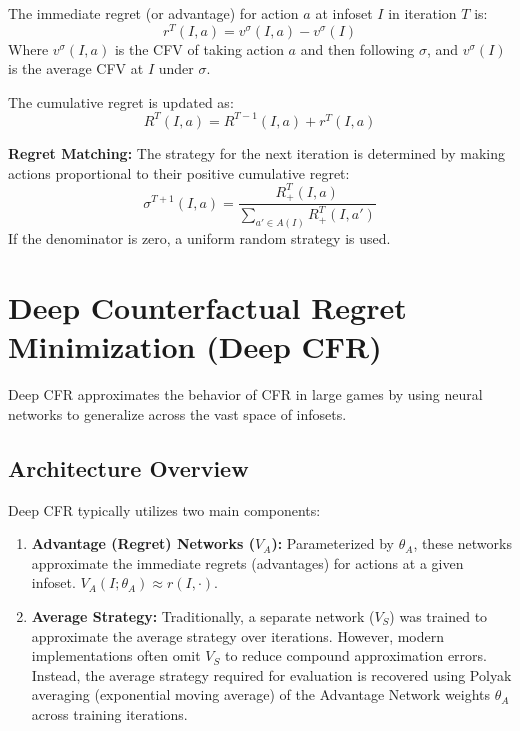 \documentclass[11pt,a4paper]{article}
\begin{document}
The immediate regret (or advantage) for action $a$ at infoset $I$ in iteration $T$ is:
\begin{equation}
r^T(I, a) = v^\sigma(I, a) - v^\sigma(I)
\end{equation}
Where $v^\sigma(I, a)$ is the CFV of taking action $a$ and then following $\sigma$, and $v^\sigma(I)$ is the average CFV at $I$ under $\sigma$.

The cumulative regret is updated as:
\begin{equation}
R^T(I, a) = R^{T-1}(I, a) + r^T(I, a)
\end{equation}

\textbf{Regret Matching:} The strategy for the next iteration is determined by making actions proportional to their positive cumulative regret:
\begin{equation}
\sigma^{T+1}(I, a) = \frac{R_{+}^{T}(I, a)}{\sum_{a' \in A(I)} R_{+}^{T}(I, a')}
\end{equation}
If the denominator is zero, a uniform random strategy is used.

\section{Deep Counterfactual Regret Minimization (Deep CFR)}

Deep CFR approximates the behavior of CFR in large games by using neural networks to generalize across the vast space of infosets.

\subsection{Architecture Overview}

Deep CFR typically utilizes two main components:

\begin{enumerate}
    \item \textbf{Advantage (Regret) Networks ($V_A$):} Parameterized by $\theta_A$, these networks approximate the immediate regrets (advantages) for actions at a given infoset. $V_A(I; \theta_A) \approx r(I, \cdot)$.
    \item \textbf{Average Strategy:} Traditionally, a separate network ($V_S$) was trained to approximate the average strategy over iterations. However, modern implementations often omit $V_S$ to reduce compound approximation errors. Instead, the average strategy required for evaluation is recovered using Polyak averaging (exponential moving average) of the Advantage Network weights $\theta_A$ across training iterations.
\end{enumerate}
\end{document}
